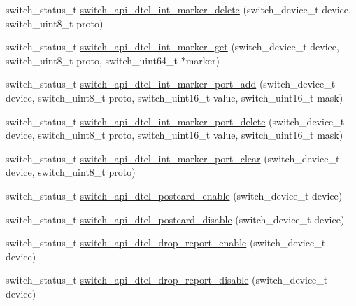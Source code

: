 \begin{DoxyCompactItemize}
\item 
switch\+\_\+status\+\_\+t \hyperlink{group__DTel_ga2947c5cf7a73a40eb503e3bee76a44fd}{switch\+\_\+api\+\_\+dtel\+\_\+int\+\_\+marker\+\_\+delete} (switch\+\_\+device\+\_\+t device, switch\+\_\+uint8\+\_\+t proto)
\item 
switch\+\_\+status\+\_\+t \hyperlink{group__DTel_ga4c141012f4cde531fbee0499297cea9e}{switch\+\_\+api\+\_\+dtel\+\_\+int\+\_\+marker\+\_\+get} (switch\+\_\+device\+\_\+t device, switch\+\_\+uint8\+\_\+t proto, switch\+\_\+uint64\+\_\+t $\ast$marker)
\item 
switch\+\_\+status\+\_\+t \hyperlink{group__DTel_gadfc2dcce67fd0a25f276d5197e5ecc17}{switch\+\_\+api\+\_\+dtel\+\_\+int\+\_\+marker\+\_\+port\+\_\+add} (switch\+\_\+device\+\_\+t device, switch\+\_\+uint8\+\_\+t proto, switch\+\_\+uint16\+\_\+t value, switch\+\_\+uint16\+\_\+t mask)
\item 
switch\+\_\+status\+\_\+t \hyperlink{group__DTel_gaf407b78480c5c69687ba6b828858f3e6}{switch\+\_\+api\+\_\+dtel\+\_\+int\+\_\+marker\+\_\+port\+\_\+delete} (switch\+\_\+device\+\_\+t device, switch\+\_\+uint8\+\_\+t proto, switch\+\_\+uint16\+\_\+t value, switch\+\_\+uint16\+\_\+t mask)
\item 
switch\+\_\+status\+\_\+t \hyperlink{group__DTel_gaa1485b2329ef4cc1ffaefce22b98822b}{switch\+\_\+api\+\_\+dtel\+\_\+int\+\_\+marker\+\_\+port\+\_\+clear} (switch\+\_\+device\+\_\+t device, switch\+\_\+uint8\+\_\+t proto)
\item 
switch\+\_\+status\+\_\+t \hyperlink{group__DTel_ga0ecf24d7f98e6f97000bee1043fbcdea}{switch\+\_\+api\+\_\+dtel\+\_\+postcard\+\_\+enable} (switch\+\_\+device\+\_\+t device)
\item 
switch\+\_\+status\+\_\+t \hyperlink{group__DTel_ga64461c782a669144886b5a30ba4cc570}{switch\+\_\+api\+\_\+dtel\+\_\+postcard\+\_\+disable} (switch\+\_\+device\+\_\+t device)
\item 
switch\+\_\+status\+\_\+t \hyperlink{group__DTel_ga944993224c7844e080f9ecefff597a04}{switch\+\_\+api\+\_\+dtel\+\_\+drop\+\_\+report\+\_\+enable} (switch\+\_\+device\+\_\+t device)
\item 
switch\+\_\+status\+\_\+t \hyperlink{group__DTel_ga775b747a27c971db8dcfb3779d53dc94}{switch\+\_\+api\+\_\+dtel\+\_\+drop\+\_\+report\+\_\+disable} (switch\+\_\+device\+\_\+t device)
\end{DoxyCompactItemize}



